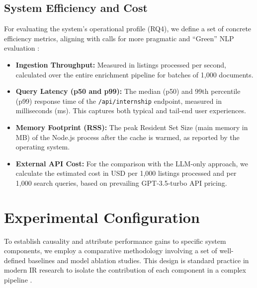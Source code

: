\subsection{System Efficiency and Cost}
For evaluating the system's operational profile (RQ4), we define a set of concrete efficiency metrics, aligning with calls for more pragmatic and ``Green'' NLP evaluation \cite{schwartz2020green, menghani2023efficient}:
\begin{itemize}
    \item \textbf{Ingestion Throughput:} Measured in listings processed per second, calculated over the entire enrichment pipeline for batches of 1,000 documents.
    \item \textbf{Query Latency (p50 and p99):} The median (p50) and 99th percentile (p99) response time of the \texttt{/api/internship} endpoint, measured in milliseconds (ms). This captures both typical and tail-end user experiences.
    \item \textbf{Memory Footprint (RSS):} The peak Resident Set Size (main memory in MB) of the Node.js process after the cache is warmed, as reported by the operating system.
    \item \textbf{External API Cost:} For the comparison with the LLM-only approach, we calculate the estimated cost in USD per 1,000 listings processed and per 1,000 search queries, based on prevailing GPT-3.5-turbo API pricing.
\end{itemize}

\section{Experimental Configuration}
To establish causality and attribute performance gains to specific system components, we employ a comparative methodology involving a set of well-defined baselines and model ablation studies. This design is standard practice in modern IR research to isolate the contribution of each component in a complex pipeline \cite{thakur2021beir, luan2021sparse}.

